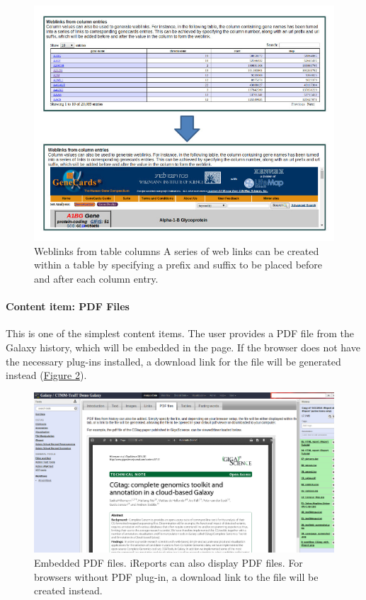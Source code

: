 \begin{figure}[h!]
    \includegraphics[width=\textwidth]{chapters/images/iReport/Hiltemann_columnlinks.jpg}
    \caption{Weblinks from table columns
   A series of web links can be created within a table by specifying a prefix and suffix to be placed before and after each column entry.}
    \label{fig:collinks}
\end{figure}

\paragraph*{Content item: PDF Files}
This is one of the simplest content items. The user provides a PDF file from the Galaxy history, which will be embedded in the page. If the browser does not have the necessary plug-ins installed, a download link for the file will be generated instead (\hyperref[fig:pdfexample]{Figure \ref*{fig:pdfexample}}).

\begin{figure}[h!]
    \includegraphics[width=\textwidth]{chapters/images/iReport/Hiltemann_PDF.jpg}
    \caption{Embedded PDF files. iReports can also display PDF files. For browsers without PDF plug-in, a download link to the file will be created instead. }
    \label{fig:pdfexample}
\end{figure}

